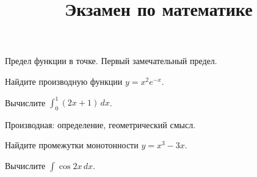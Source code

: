 \documentclass[bilety]{petrovsky}
\title{Экзамен по математике}
\begin{document}
\maketitle
\begin{ticket}
  \item Предел функции в точке. Первый замечательный предел.
  \item Найдите производную функции $y = x^2 e^{-x}$.
  \item Вычислите $\displaystyle\int_0^1 (2x+1)\,dx$.
\end{ticket}
\begin{ticket}
  \item Производная: определение, геометрический смысл.
  \item Найдите промежутки монотонности $y = x^3 - 3x$.
  \item Вычислите $\displaystyle\int \cos 2x\,dx$.
\end{ticket}
\end{document}
